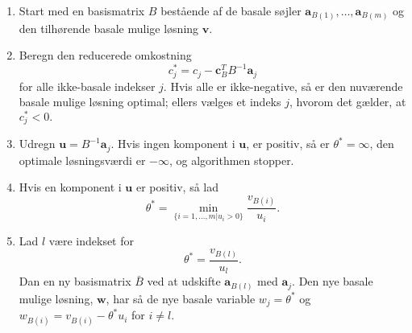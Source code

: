 \begin{tcolorbox}[
title=Den naive implementering,
colback		= myblue!15,
colframe	= myblue!15,
coltitle	= black,
before skip	= 20pt plus 2pt,
after skip	= 20pt plus 2pt,
fonttitle	= \bfseries]
\begin{enumerate}
\item Start med en basismatrix $B$ bestående af de basale søjler $\textbf{a}_{B(1)},\ldots,\textbf{a}_{B(m)}$ og den tilhørende basale mulige løsning $\textbf{v}$.
\item Beregn den reducerede omkostning $$c_j^* = c_j - \mathbf{c}_B^T B^{-1}\textbf{a}_j$$ for alle ikke-basale indekser $j$.
Hvis alle er ikke-negative, så er den nuværende basale mulige løsning optimal; ellers vælges et indeks $j$, hvorom det gælder, at $c^*_j<0.$
\item Udregn $\textbf{u}=B^{-1}\textbf{a}_j$.
Hvis ingen komponent i $\textbf{u}$, er positiv, så er $\theta ^*=\infty$, den optimale løsningsværdi er $-\infty$, og algorithmen stopper.
\item Hvis en komponent i $\textbf{u}$ er positiv, så lad 
$$\theta^*= \min_{ \{i=1,\ldots,m|u_i>0 \} }        \dfrac{v_{B(i)}}{u_i}.$$
\item Lad $l$ være indekset for $$\theta^*=  \dfrac{v_{B(l)}}{u_l}.$$
Dan en ny basismatrix $\bar{B}$ ved at udskifte $\textbf{a}_{B(l)}$ med $\textbf{a}_j$.
Den nye basale mulige løsning, $\textbf{w}$, har så de nye basale variable $w_j=\theta^*$ og $w_{B(i)}=v_{B(i)}-\theta^*u_i$ for $i\neq l.$
\end{enumerate}
\end{tcolorbox}
%
